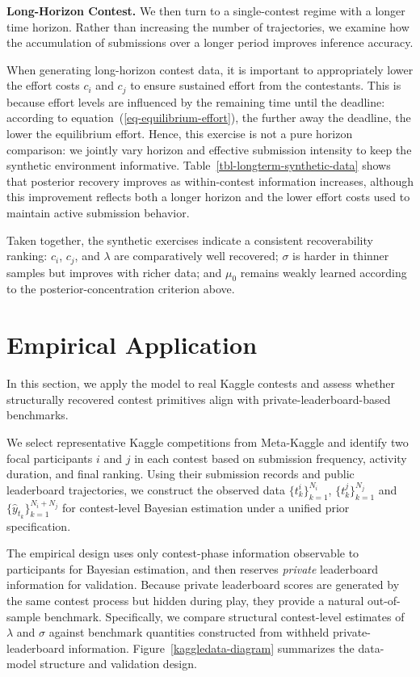 \documentclass[mnsc]{informs3}
\begin{document}
\textbf{Long-Horizon Contest.}
We then turn to a single-contest regime with a longer time horizon.
Rather than increasing the number of trajectories, we examine how the accumulation of submissions over a longer period improves inference accuracy.

When generating long-horizon contest data, it is important to appropriately lower the effort costs $c_i$ and $c_j$ to ensure sustained effort from the contestants.
This is because effort levels are influenced by the remaining time until the deadline:
according to equation~(\ref{eq-equilibrium-effort}), the further away the deadline, the lower the equilibrium effort.
Hence, this exercise is not a pure horizon comparison: we jointly vary horizon and effective submission intensity to keep the synthetic environment informative.
Table~\ref{tbl-longterm-synthetic-data} shows that posterior recovery improves as within-contest information increases, although this improvement reflects both a longer horizon and the lower effort costs used to maintain active submission behavior.

Taken together, the synthetic exercises indicate a consistent recoverability ranking: $c_i$, $c_j$, and $\lambda$ are comparatively well recovered; $\sigma$ is harder in thinner samples but improves with richer data; and $\mu_0$ remains weakly learned according to the posterior-concentration criterion above.




\section{Empirical Application}
\label{sec-kaggle-application}

In this section, we apply the model to real Kaggle contests and assess whether structurally recovered contest primitives align with private-leaderboard-based benchmarks.

We select representative Kaggle competitions from Meta-Kaggle and identify two focal participants $i$ and $j$ in each contest based on submission frequency, activity duration, and final ranking.
Using their submission records and public leaderboard trajectories, we construct the observed data $\{t^i_k\}^{N_i}_{k=1}$, $\{t^j_k\}^{N_j}_{k=1}$ and $\{\hat{y}_{t_k}\}_{k=1}^{N_i+N_j}$ for contest-level Bayesian estimation under a unified prior specification.

The empirical design uses only contest-phase information observable to participants for Bayesian estimation, and then reserves \textit{private} leaderboard information for validation.
Because private leaderboard scores are generated by the same contest process but hidden during play, they provide a natural out-of-sample benchmark.
Specifically, we compare structural contest-level estimates of $\lambda$ and $\sigma$ against benchmark quantities constructed from withheld private-leaderboard information.
Figure~\ref{kaggledata-diagram} summarizes the data-model structure and validation design.
\end{document}
